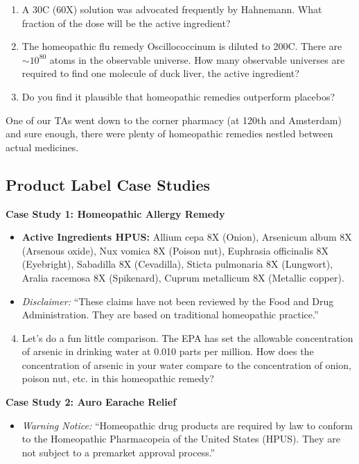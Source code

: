 \documentclass[11pt]{article}
\begin{document}
\begin{enumerate}
    \item A 30C (60X) solution was advocated frequently by Hahnemann. What fraction of the dose will be the active ingredient?
    \item The homeopathic flu remedy Oscillococcinum is diluted to 200C. There are $\sim 10^{80}$ atoms in the observable universe. How many observable universes are required to find one molecule of duck liver, the active ingredient?
    \item Do you find it plausible that homeopathic remedies outperform placebos?
\end{enumerate}

One of our TAs went down to the corner pharmacy (at 120th and Amsterdam) and sure enough, there were plenty of homeopathic remedies nestled between actual medicines.

\subsection*{Product Label Case Studies}
\textbf{Case Study 1: Homeopathic Allergy Remedy}
\begin{itemize}[noitemsep]
    \item \textbf{Active Ingredients HPUS:} Allium cepa 8X (Onion), Arsenicum album 8X (Arsenous oxide), Nux vomica 8X (Poison nut), Euphrasia officinalis 8X (Eyebright), Sabadilla 8X (Cevadilla), Sticta pulmonaria 8X (Lungwort), Aralia racemosa 8X (Spikenard), Cuprum metallicum 8X (Metallic copper).
    \item \textit{Disclaimer:} ``These claims have not been reviewed by the Food and Drug Administration. They are based on traditional homeopathic practice.''
\end{itemize}

\begin{enumerate}
    \setcounter{enumi}{3}
    \item Let's do a fun little comparison. The EPA has set the allowable concentration of arsenic in drinking water at 0.010 parts per million. How does the concentration of arsenic in your water compare to the concentration of onion, poison nut, etc. in this homeopathic remedy?
\end{enumerate}

\textbf{Case Study 2: Auro Earache Relief}
\begin{itemize}[noitemsep]
    \item \textit{Warning Notice:} ``Homeopathic drug products are required by law to conform to the Homeopathic Pharmacopeia of the United States (HPUS). They are not subject to a premarket approval process.''
\end{itemize}
\end{document}
